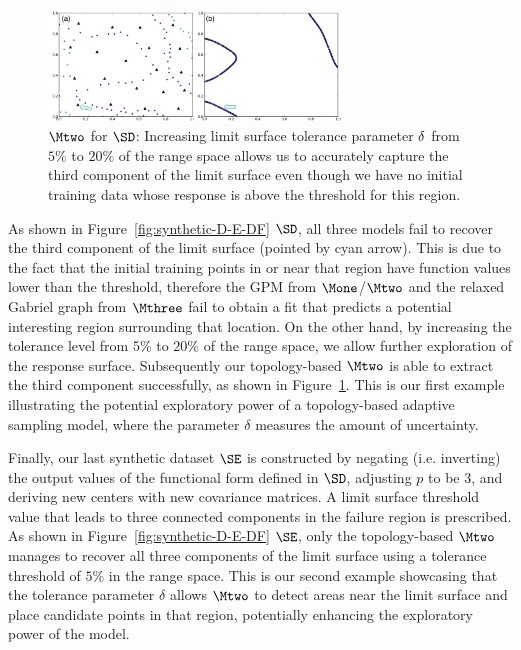 \begin{figure}[!ht]
\centering
\includegraphics[width=0.7\textwidth]{figs/chap5/synthetic-D-20percent.pdf}
\caption{
$\protect\Mtwo$ for $\protect\SD$: Increasing limit surface tolerance parameter $\protect\delta$
from $5\%$ to $20\%$ of the range space allows us to accurately capture the third component of the limit surface even though we have no initial training data whose response is above the threshold for this region.
}
\label{fig:df-20percent}
\end{figure}

As shown in Figure~\ref{fig:synthetic-D-E-DF} $\SD$, all three models fail to recover the third component of the limit surface (pointed by cyan arrow).
%
This is due to the fact that the initial training points in or near that region have function values lower than the threshold, therefore the GPM from $\Mone$/$\Mtwo$ and the relaxed Gabriel graph from $\Mthree$ fail to obtain a fit that predicts a potential interesting region surrounding that location.
%
On the other hand, by increasing the tolerance level from $5\%$ to $20\%$ of the range space,  we allow further exploration of the response surface.
%
Subsequently our topology-based $\Mtwo$ is able to extract the third component successfully, as shown in Figure~\ref{fig:df-20percent}.
%
This is our first example illustrating the potential exploratory power of a topology-based adaptive sampling model, where the parameter $\delta$ measures the amount of uncertainty.


Finally, our last synthetic dataset $\SE$ is constructed by negating (i.e. inverting) the output values of the functional form defined in $\SD$, adjusting $p$ to be $3$, and deriving new centers with new covariance matrices.
%
A limit surface threshold value that leads to three connected components in the failure region is prescribed.
%
As shown in Figure~\ref{fig:synthetic-D-E-DF} $\SE$, only the topology-based $\Mtwo$ manages to recover all three components of the limit surface using a tolerance threshold of $5\%$ in the range space.
%
This is our second example showcasing that the tolerance parameter $\delta$ allows $\Mtwo$ to detect areas near the limit surface and place candidate points in that region, potentially enhancing the exploratory power of the model.

